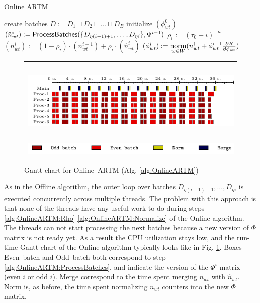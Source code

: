 \documentclass[russian,english]{llncs}
\newcommand{\norm}{\mathop{\rm norm}\limits}
\newcommand{\kw}[1]{\mbox{\textsf{#1}}}
\begin{document}
\SetAlgoSkip{}
\begin{algorithm2e}[t]
	\caption{Online ARTM} %
	\label{alg:OnlineARTM}
	\BlankLine
	\BlankLine
	create batches $D := D_1 \sqcup D_2 \sqcup \dots \sqcup D_B$\;
	initialize $(\phi^0_{wt})$\;
	 {
		$(\hat n^i_{wt}) := \kw{ProcessBatches}(\{D_{\eta (i - 1) + 1}, \dots, D_{\eta i}\}, \Phi^{i - 1})$\;
		\label{alg:OnlineARTM:ProcessBatches}
		$\rho_i := (\tau_0 + i)^{-\kappa}$\;
		\label{alg:OnlineARTM:Rho}
		$(n^{i}_{wt}) := (1 - \rho_i) \cdot (n^{i-1}_{wt}) + \rho_i \cdot (\hat n^{i}_{wt})$\;
		\label{alg:OnlineARTM:Merge}
		$(\phi^{i}_{wt}) := \norm_{w \in W} (n^{i}_{wt} + \phi^{i - 1}_{wt} \frac{\partial R}{\partial \phi_{wt}})$\;
		\label{alg:OnlineARTM:Normalize}
	}
\end{algorithm2e}
\begin{figure}[t!]
	\centering
	\begin{tabular}{c}
		\includegraphics[height=4cm, width=12cm]{plots/online.pdf} \\
		\includegraphics[scale=1]{plots/legend_online.pdf}
	\end{tabular}
	\caption{Gantt chart for \kw{Online ARTM} (Alg. \ref{alg:OnlineARTM})} \label{fig:gantt:OnlineARTM}
\end{figure}

As in the \kw{Offline} algorithm, the outer loop over batches
$D_{\eta (i - 1) + 1}, \dots, D_{\eta i}$ is executed concurrently across multiple threads.
The problem with this approach is that none of the threads have any useful work to do during steps
\ref{alg:OnlineARTM:Rho}-\ref{alg:OnlineARTM:Normalize} of the \kw{Online} algorithm.
The threads can not start processing the next batches because a new version of $\Phi$ matrix is not ready yet.
As a result the CPU utilization stays low, and the run-time Gantt chart of the \kw{Online} algorithm typically looks like in Fig. \ref{fig:gantt:OnlineARTM}.
Boxes \kw{Even batch} and \kw{Odd batch} both correspond to step \ref{alg:OnlineARTM:ProcessBatches},
and indicate the version of the $\Phi^i$ matrix (even $i$ or odd $i$).
\kw{Merge} correspond to the time spent merging $n_{wt}$ with $\hat n_{wt}$.
\kw{Norm} is, as before, the time spent normalizing $n_{wt}$ counters into the new $\Phi$ matrix.
\end{document}
